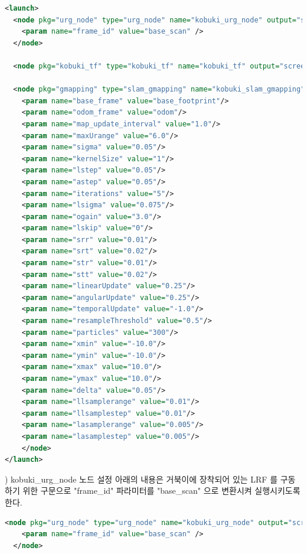 \vspace{\baselineskip}
\begin{lstlisting}[language=XML]
<launch>
  <node pkg="urg_node" type="urg_node" name="kobuki_urg_node" output="screen">
    <param name="frame_id" value="base_scan" />
  </node>

  <node pkg="kobuki_tf" type="kobuki_tf" name="kobuki_tf" output="screen"></node>

  <node pkg="gmapping" type="slam_gmapping" name="kobuki_slam_gmapping" output="screen">
    <param name="base_frame" value="base_footprint"/>
    <param name="odom_frame" value="odom"/>
    <param name="map_update_interval" value="1.0"/>
    <param name="maxUrange" value="6.0"/>
    <param name="sigma" value="0.05"/>
    <param name="kernelSize" value="1"/>
    <param name="lstep" value="0.05"/>
    <param name="astep" value="0.05"/>
    <param name="iterations" value="5"/>
    <param name="lsigma" value="0.075"/>
    <param name="ogain" value="3.0"/>
    <param name="lskip" value="0"/>
    <param name="srr" value="0.01"/>
    <param name="srt" value="0.02"/>
    <param name="str" value="0.01"/>
    <param name="stt" value="0.02"/>
    <param name="linearUpdate" value="0.25"/>
    <param name="angularUpdate" value="0.25"/>
    <param name="temporalUpdate" value="-1.0"/>
    <param name="resampleThreshold" value="0.5"/>
    <param name="particles" value="300"/>
    <param name="xmin" value="-10.0"/>
    <param name="ymin" value="-10.0"/>
    <param name="xmax" value="10.0"/>
    <param name="ymax" value="10.0"/>
    <param name="delta" value="0.05"/>
    <param name="llsamplerange" value="0.01"/>
    <param name="llsamplestep" value="0.01"/>
    <param name="lasamplerange" value="0.005"/>
    <param name="lasamplestep" value="0.005"/>
    </node>
</launch>
\end{lstlisting}



\vspace{\baselineskip}
\noindent
{}) kobuki\_urg\_node 노드 설정
아래의 내용은 거북이에 장착되어 있는 LRF 를 구동하기 위한 구문으로 "frame\_id" 파라미터를 "base\_scan" 으로 변환시켜 실행시키도록 한다.

\vspace{\baselineskip}
\begin{lstlisting}[language=XML]
  <node pkg="urg_node" type="urg_node" name="kobuki_urg_node" output="screen">
    <param name="frame_id" value="base_scan" />
  </node>
\end{lstlisting}

